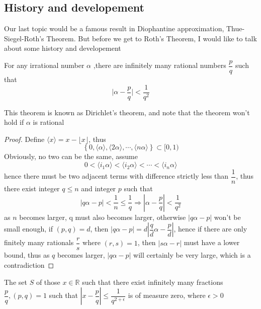 \subsection{History and developement}

Our last topic would be a famous result in Diophantine approximation, Thue-Siegel-Roth's Theorem. But before we get to Roth's Theorem, I would like to talk about some history and developement

\begin{theorem}\label{theorem 24}
For any irrational number $ \alpha $ ,there are infinitely many rational numbers $ \dfrac{p}{q} $ such that
$$ \Big| \alpha - \dfrac{p}{q} \Big| < \dfrac{1}{q^{2}} $$
\end{theorem}

\begin{remark}
This theorem is known as Dirichlet's theorem, and note that the theorem won't hold if $ \alpha $ is rational
\end{remark}

\begin{proof}
Define $ \langle x \rangle = x - \lfloor x \rfloor $, thus
$$ \left\{ 0, \langle \alpha \rangle, \langle 2\alpha \rangle, \cdots, \langle n\alpha \rangle \right\} \subset [0,1) $$
Obviously, no two can be the same, assume
$$ 0 < \langle i_{1}\alpha \rangle < \langle i_{2}\alpha \rangle < \cdots < \langle i_{n}\alpha \rangle $$
hence there must be two adjacent terms with difference strictly less than $ \dfrac{1}{n} $, thus there exist integer $ q \leq n $ and integer $ p $ such that
$$ \left| q\alpha - p \right| < \dfrac{1}{n} \leq \dfrac{1}{q} \Rightarrow \left| \alpha - \dfrac{p}{q} \right| < \dfrac{1}{q^{2}} $$
as $ n $ becomes larger, q must also becomes larger, otherwise $ \left| q\alpha - p \right| $ won't be small enough, if $ (p,q) = d $, then $ \left| q\alpha - p \right| = d\left| \dfrac{q}{d}\alpha - \dfrac{p}{d} \right| $, hence if there are only finitely many rationals $ \dfrac{r}{s} $ where $ (r,s) = 1 $, then $ \left| s\alpha - r \right| $ must have a lower bound, thus as $ q $ becomes larger, $ \left| q\alpha - p \right| $ will certainly be very large, which is a contradiction
\end{proof}

\begin{theorem}\label{theorem 25}
The set $ S $ of those $ x \in \mathbb{R} $ such that there exist infinitely many fractions $ \dfrac{p}{q}, (p,q) = 1 $
such that $ \left| x - \dfrac{p}{q} \right| \leq \dfrac{1}{q^{2+\epsilon}} $ is of measure zero, where $ \epsilon > 0 $
\end{theorem}

